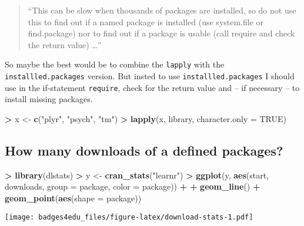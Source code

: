 \documentclass[]{book}
\newenvironment{Shaded}{\begin{snugshade}}{\end{snugshade}}
\newcommand{\KeywordTok}[1]{\textcolor[rgb]{0.13,0.29,0.53}{\textbf{#1}}}
\newcommand{\DataTypeTok}[1]{\textcolor[rgb]{0.13,0.29,0.53}{#1}}
\newcommand{\StringTok}[1]{\textcolor[rgb]{0.31,0.60,0.02}{#1}}
\newcommand{\OtherTok}[1]{\textcolor[rgb]{0.56,0.35,0.01}{#1}}
\newcommand{\OperatorTok}[1]{\textcolor[rgb]{0.81,0.36,0.00}{\textbf{#1}}}
\newcommand{\NormalTok}[1]{#1}
\theoremstyle{definition}
\theoremstyle{definition}
\theoremstyle{definition}
\theoremstyle{remark}
\begin{document}
\begin{quote}
``This can be slow when thousands of packages are installed, so do not
use this to find out if a named package is installed (use system.file or
find.package) nor to find out if a package is usable (call require and
check the return value) \ldots{}''
\end{quote}

So maybe the best would be to combine the \texttt{lapply} with the
\texttt{installled.packages} version. But insted to use
\texttt{installled.packages} I should use in the if-statement
\texttt{require}, check for the return value and -- if necessary -- to
install missing packages.

\begin{Shaded}
\begin{Highlighting}[]
\OperatorTok{>}\StringTok{ }\NormalTok{x <-}\StringTok{ }\KeywordTok{c}\NormalTok{(}\StringTok{"plyr"}\NormalTok{, }\StringTok{"psych"}\NormalTok{, }\StringTok{"tm"}\NormalTok{)}
\OperatorTok{>}\StringTok{ }\KeywordTok{lapply}\NormalTok{(x, library, }\DataTypeTok{character.only =} \OtherTok{TRUE}\NormalTok{)}
\end{Highlighting}
\end{Shaded}

\subsection{How many downloads of a defined
packages?}\label{how-many-downloads-of-a-defined-packages}

\begin{Shaded}
\begin{Highlighting}[]
\OperatorTok{>}\StringTok{ }\KeywordTok{library}\NormalTok{(dlstats)}
\OperatorTok{>}\StringTok{ }\NormalTok{y <-}\StringTok{ }\KeywordTok{cran_stats}\NormalTok{(}\StringTok{"learnr"}\NormalTok{)}
\OperatorTok{>}\StringTok{ }\KeywordTok{ggplot}\NormalTok{(y, }\KeywordTok{aes}\NormalTok{(start, downloads, }\DataTypeTok{group =}\NormalTok{ package, }\DataTypeTok{color =}\NormalTok{ package)) }\OperatorTok{+}
\OperatorTok{+}\StringTok{         }\KeywordTok{geom_line}\NormalTok{() }\OperatorTok{+}\StringTok{ }\KeywordTok{geom_point}\NormalTok{(}\KeywordTok{aes}\NormalTok{(}\DataTypeTok{shape =}\NormalTok{ package))}
\end{Highlighting}
\end{Shaded}

\texttt{[image: badges4edu\_files/figure-latex/download-stats-1.pdf]}
\end{document}
